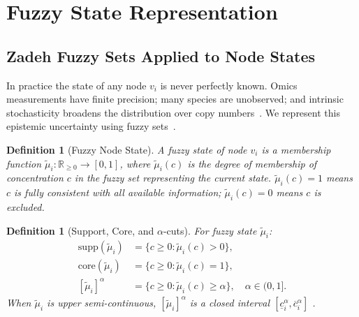 \documentclass[twocolumn,10pt,a4paper]{article}
\newtheorem{definition}[theorem]{Definition}
\begin{document}
\section{Fuzzy State Representation}
\label{sec:fuzzy}

\subsection{Zadeh Fuzzy Sets Applied to Node States}
\label{sec:fuzzy-zadeh}

In practice the state of any node $v_i$ is never perfectly known.  Omics
measurements have finite precision; many species are unobserved; and intrinsic
stochasticity broadens the distribution over copy
numbers~\cite{Elowitz2002,vanKampen2007}.  We represent this epistemic
uncertainty using fuzzy sets~\cite{Zadeh1965}.

\begin{definition}[Fuzzy Node State]
\label{def:fuzzy-state}
A \emph{fuzzy state} of node $v_i$ is a membership function
$\tilde{\mu}_i:\mathbb{R}_{\geq 0}\to[0,1]$, where $\tilde{\mu}_i(c)$ is the
\emph{degree of membership} of concentration $c$ in the fuzzy set representing
the current state.  $\tilde{\mu}_i(c)=1$ means $c$ is fully consistent with
all available information; $\tilde{\mu}_i(c)=0$ means $c$ is excluded.
\end{definition}

\begin{definition}[Support, Core, and $\alpha$-cuts]
\label{def:alpha-cut}
For fuzzy state $\tilde{\mu}_i$:
\begin{align}
  \mathrm{supp}(\tilde{\mu}_i) &= \{c\geq 0:\tilde{\mu}_i(c)>0\}, \\
  \mathrm{core}(\tilde{\mu}_i) &= \{c\geq 0:\tilde{\mu}_i(c)=1\}, \\
  [\tilde{\mu}_i]^\alpha        &= \{c\geq 0:\tilde{\mu}_i(c)\geq\alpha\},
  \quad\alpha\in(0,1].
\end{align}
When $\tilde{\mu}_i$ is upper semi-continuous, $[\tilde{\mu}_i]^\alpha$ is a
closed interval $[\underline{c}_i^\alpha,\overline{c}_i^\alpha]$
\cite{Zadeh1978,Zimmermann2001book}.
\end{definition}
\end{document}
